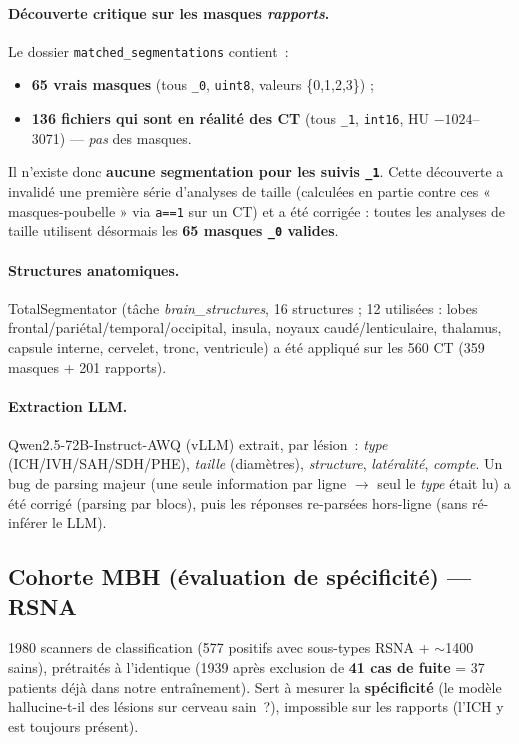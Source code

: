 \documentclass[11pt,a4paper]{article}
\begin{document}
\paragraph{Découverte critique sur les masques \emph{rapports}.} Le dossier
\texttt{matched\_segmentations} contient~:
\begin{itemize}[nosep]
  \item \textbf{65 vrais masques} (tous \texttt{\_0}, \texttt{uint8}, valeurs \{0,1,2,3\}) ;
  \item \textbf{136 fichiers qui sont en réalité des CT} (tous \texttt{\_1}, \texttt{int16},
  HU $-1024$--3071) --- \emph{pas} des masques.
\end{itemize}
Il n'existe donc \textbf{aucune segmentation pour les suivis \texttt{\_1}}. Cette découverte
a invalidé une première série d'analyses de taille (calculées en partie contre ces
« masques-poubelle » via \texttt{a==1} sur un CT) et a été corrigée : toutes les analyses
de taille utilisent désormais les \textbf{65 masques \texttt{\_0} valides}.

\paragraph{Structures anatomiques.} TotalSegmentator (tâche \emph{brain\_structures},
16 structures ; 12 utilisées : lobes frontal/pariétal/temporal/occipital, insula, noyaux
caudé/lenticulaire, thalamus, capsule interne, cervelet, tronc, ventricule) a été appliqué
sur les 560 CT (359 masques + 201 rapports).

\paragraph{Extraction LLM.} Qwen2.5-72B-Instruct-AWQ (vLLM) extrait, par lésion~:
\emph{type} (ICH/IVH/SAH/SDH/PHE), \emph{taille} (diamètres), \emph{structure},
\emph{latéralité}, \emph{compte}. Un bug de parsing majeur (une seule information par ligne
$\rightarrow$ seul le \emph{type} était lu) a été corrigé (parsing par blocs), puis les
réponses re-parsées hors-ligne (sans ré-inférer le LLM).

\subsection{Cohorte MBH (évaluation de spécificité) --- RSNA}
1980 scanners de classification (577 positifs avec sous-types RSNA + $\sim$1400 sains),
prétraités à l'identique (1939 après exclusion de \textbf{41 cas de fuite} = 37 patients
déjà dans notre entraînement). Sert à mesurer la \textbf{spécificité} (le modèle hallucine-t-il
des lésions sur cerveau sain~?), impossible sur les rapports (l'ICH y est toujours présent).
\end{document}
